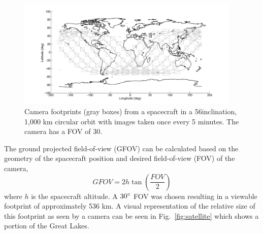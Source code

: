 \documentclass[]{aiaa-tc}%
\begin{document}
\begin{figure}[ht!]
\centering
\includegraphics[width=0.95\textwidth]{ISScoverage} %
\caption{Camera footprints (gray boxes) from a spacecraft in a 56\degree inclination, 1,000 km circular orbit with images taken once every 5 minutes.  The camera has a FOV of 30\degree.}
\label{fig:coverage}
\end{figure}
%
The ground projected field-of-view (GFOV) can be calculated based on the geometry of the spacecraft position and desired field-of-view (FOV) of the camera,
%
\begin{equation}
GFOV=2h\tan\left(\frac{FOV}{2}\right)
\label{eq:GFOV}
\end{equation}
%
where $h$ is the spacecraft altitude.  A $30\degree$ FOV was chosen resulting in a viewable footprint of approximately 536 km.  A visual representation of the relative size of this footprint as seen by a camera can be seen in Fig.~\ref{fig:satellite} which shows a portion of the Great Lakes.
%
\end{document}
